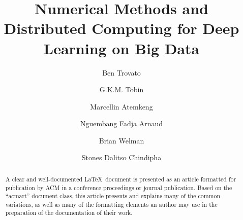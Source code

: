 \documentclass[acmsmall]{acmart}
\begin{document}

\title{Numerical Methods and Distributed Computing for Deep Learning on Big Data}

\author{Ben Trovato}
\author{G.K.M. Tobin}
\authornotemark[1]

\author{Marcellin Atemkeng}

\author{Nguembang Fadja Arnaud}

\author{Brian Welman}

\author{Stones Dalitso Chindipha}

\renewcommand{\shortauthors}{Trovato et al.}

\begin{abstract}
    A clear and well-documented \LaTeX\ document is presented as an
    article formatted for publication by ACM in a conference proceedings
    or journal publication. Based on the ``acmart'' document class, this
    article presents and explains many of the common variations, as well
    as many of the formatting elements an author may use in the
    preparation of the documentation of their work.
\end{abstract}
\end{document}
